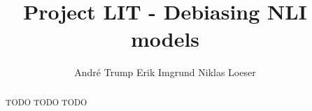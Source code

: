 \documentclass[11pt]{article}
\title{Project LIT - Debiasing \acs{NLI} models}
\author{André Trump \And
  Erik Imgrund \And
  Niklas Loeser }
\begin{document}


\maketitle
\begin{abstract}
TODO TODO TODO
\end{abstract}









\end{document}
